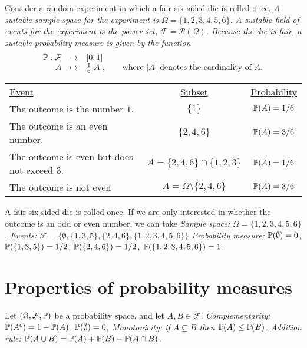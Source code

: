 \begin{example}
Consider a random experiment in which a fair six-sided die is rolled once.
\bit
\it A suitable sample space for the experiment is $\Omega=\{1,2,3,4,5,6\}$.
\it A suitable field of events for the experiment is the power set, $\mathcal{F} = \mathcal{P}(\Omega)$.
\it Because the die is fair, a suitable probability measure is given by the function
\[\begin{array}{rcl}
\mathbb{P}:	\mathcal{F} & \to 		& [0,1] \\
		A			& \mapsto 	& \frac{1}{6}|A|, \qquad\text{where $|A|$ denotes the cardinality of $A$.}

\end{array}\] 
\eit

\begin{tabular}{lcc}
\underline{Event}				& \underline{Subset} & \underline{Probability} \\
The outcome is the number $1$.	& $\{1\}$ & $\mathbb{P}(A) = 1/6$\\
The outcome is an even number.	& $\{2,4,6\}$  & $\mathbb{P}(A) = 3/6$\\
The outcome is even but does not exceed $3$.	& $A = \{2,4,6\}\cap\{1,2,3\}$  & $\mathbb{P}(A) = 1/6$\\
The outcome is not even			& $A = \Omega\setminus\{2,4,6\}$ & $\mathbb{P}(A) = 3/6$
\end{tabular}
\end{example}

\begin{example}
A fair six-sided die is rolled once. If we are only interested in whether the outcome is an odd or even number, we can take
\bit
\it Sample space: $\Omega=\{1,2,3,4,5,6\}$,
\it Events: $\mathcal{F} = \big\{\emptyset,\{1,3,5\},\{2,4,6\},\{1,2,3,4,5,6\}\big\}$
\it Probability measure: $\mathbb{P}(\emptyset)=0$, $\mathbb{P}(\{1,3,5\})=1/2$, $\mathbb{P}(\{2,4,6\})=1/2$, $\mathbb{P}(\{1,2,3,4,5,6\})=1$.
\eit
\end{example}

\section{Properties of probability measures}

\begin{theorem}\label{thm:properties_of_probability_measures}
Let $(\Omega,\mathcal{F},\mathbb{P})$ be a probability space, and let $A,B\in\mathcal{F}$. 
\ben
\it Complementarity: $\mathbb{P}(A^c) = 1 - \mathbb{P}(A)$.
\it $\mathbb{P}(\emptyset) = 0$,
\it Monotonicity: if $A\subseteq B$ then $\mathbb{P}(A)\leq \mathbb{P}(B)$.
\it Addition rule: $\mathbb{P}(A\cup B) = \mathbb{P}(A) + \mathbb{P}(B) - \mathbb{P}(A\cap B)$.
\een
\end{theorem}

